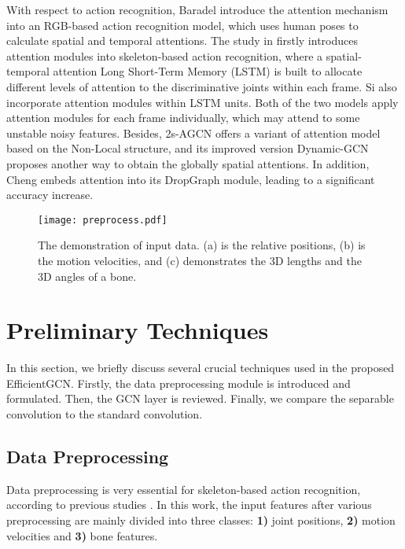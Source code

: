 \documentclass[10pt,journal,compsoc]{IEEEtran}
\begin{document}
With respect to action recognition, Baradel \etal \cite{baradel2017human} introduce the attention mechanism into an RGB-based action recognition model, which uses human poses to calculate spatial and temporal attentions. The study in \cite{song2017end} firstly introduces attention modules into skeleton-based action recognition, where a spatial-temporal attention Long Short-Term Memory (LSTM) is built to allocate different levels of attention to the discriminative joints within each frame. Si \etal \cite{si2019attention} also incorporate attention modules within LSTM units. Both of the two models apply attention modules for each frame individually, which may attend to some unstable noisy features. Besides, 2s-AGCN \cite{shi2019two} offers a variant of attention model based on the Non-Local structure, and its improved version Dynamic-GCN \cite{ye2020dynamic} proposes another way to obtain the globally spatial attentions. In addition, Cheng \etal \cite{cheng2020decoupling} embeds attention into its DropGraph module, leading to a significant accuracy increase.

\begin{figure}[t]
  \centerline{\texttt{[image: preprocess.pdf]}}
  \vspace{-0.4cm}
  \caption{The demonstration of input data. (a) is the relative positions, (b) is the motion velocities, and (c) demonstrates the 3D lengths and the 3D angles of a bone. \bv}\label{fig:preprocessing}
  \vspace{-0.4cm}
\end{figure}

\section{Preliminary Techniques}
\label{sec:techniques}

In this section, we briefly discuss several crucial techniques used in the proposed EfficientGCN. Firstly, the data preprocessing module is introduced and formulated. Then, the GCN layer is reviewed. Finally, we compare the separable convolution to the standard convolution.

\subsection{Data Preprocessing}
\label{ssec:preprocessing}

Data preprocessing is very essential for skeleton-based action recognition, according to previous studies \cite{song2019richly,si2018skeleton,shi2019two}. In this work, the input features after various preprocessing are mainly divided into three classes: {\bf 1)} joint positions, {\bf 2)} motion velocities and {\bf 3)} bone features.
\end{document}
